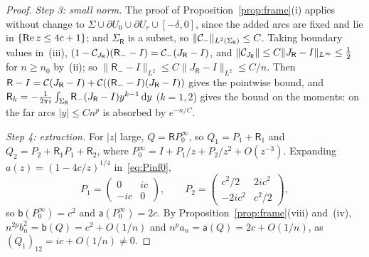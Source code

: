 \begin{proof}
\emph{Step 3: small norm.} The proof of Proposition~\ref{prop:frame}(i) applies without change to
$\Sigma\cup\partial U_0\cup\partial U_r\cup[-\delta,0]$, since the added arcs are fixed and lie in $\{\operatorname{Re} z\le4c+1\}$; and
$\Sigma_{\mathsf R}$ is a subset, so $\|\mathcal{C}_-\|_{L^2(\Sigma_{\mathsf R})}\le C$. Taking boundary values in~(iii),
$(1-\mathcal{C}_{J_{\mathsf R}})(\mathsf R_--I)=\mathcal{C}_-(J_{\mathsf R}-I)$, and $\|\mathcal{C}_{J_{\mathsf R}}\|\le C\|J_{\mathsf R}-I\|_{L^\infty}\le
\frac12$ for $n\ge n_0$ by~(ii); so $\|\mathsf R_--I\|_{L^2}\le C\|J_{\mathsf R}-I\|_{L^2}\le C/n$. Then
$\mathsf R-I=\mathcal{C}(J_{\mathsf R}-I)+\mathcal{C}((\mathsf R_--I)(J_{\mathsf R}-I))$ gives the pointwise bound, and
$\mathsf R_k=-\frac1{2\pi i}\int_{\Sigma_{\mathsf R}}\mathsf R_-(J_{\mathsf R}-I)y^{k-1}\,\mathrm{d} y$ ($k=1,2$) gives the bound on the
moments: on the far arcs $|y|\le Cn^p$ is absorbed by $e^{-n/C}$.

\emph{Step 4: extraction.} For $|z|$ large, $Q=\mathsf RP^\infty_0$, so $Q_1=P_1+\mathsf R_1$ and $Q_2=P_2+\mathsf R_1P_1+\mathsf R_2$,
where $P^\infty_0=I+P_1/z+P_2/z^2+O(z^{-3})$. Expanding $a(z)=(1-4c/z)^{1/4}$ in~\eqref{eq:Pinf0},
\begin{equation}\label{eq:P1P2}
  P_1=\begin{pmatrix}0&ic\\-ic&0\end{pmatrix},\qquad P_2=\begin{pmatrix}c^2/2&2ic^2\\-2ic^2&c^2/2\end{pmatrix},
\end{equation}
so $\mathsf b(P^\infty_0)=c^2$ and $\mathsf a(P^\infty_0)=2c$. By Proposition~\ref{prop:frame}(viii) and~(iv),
$n^{2p}b_n^2=\mathsf b(Q)=c^2+O(1/n)$ and $n^pa_n=\mathsf a(Q)=2c+O(1/n)$, as $(Q_1)_{12}=ic+O(1/n)\ne0$.
\end{proof}

